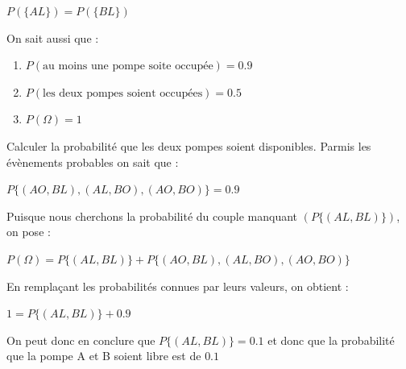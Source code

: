 \begin{exo}
		\begin{center}$P(\{AL\}) = P(\{BL\})$\end{center}
		On sait aussi que :
		\begin{enumerate}
			\item[ ] $P(\text{au moins une pompe soite occupée}) = 0.9$
			\item[ ] $P(\text{les deux pompes soient occupées}) = 0.5$
			\item[ ] $P(\Omega) = 1$
		\end{enumerate}
		\begin{subexo}{Calculer la probabilité que les deux pompes soient disponibles.}
			Parmis les évènements probables on sait que : 
			\begin{center}$P\{(AO,BL),(AL,BO),(AO,BO)\} = 0.9$\end{center}
			Puisque nous cherchons la probabilité du couple manquant $(P\{(AL,BL)\})$, on pose :
			\begin{center}$P(\Omega) = P\{(AL,BL)\} + P\{(AO,BL),(AL,BO),(AO,BO)\}$\end{center}
			En remplaçant les probabilités connues par leurs valeurs, on obtient :
			\begin{center}$1 = P\{(AL,BL)\} + 0.9$\end{center}
			On peut donc en conclure que $P\{(AL,BL)\}  = 0.1$ et donc que la probabilité que la pompe A et B soient libre est de $0.1$
		\end{subexo}
	\end{exo}
	
